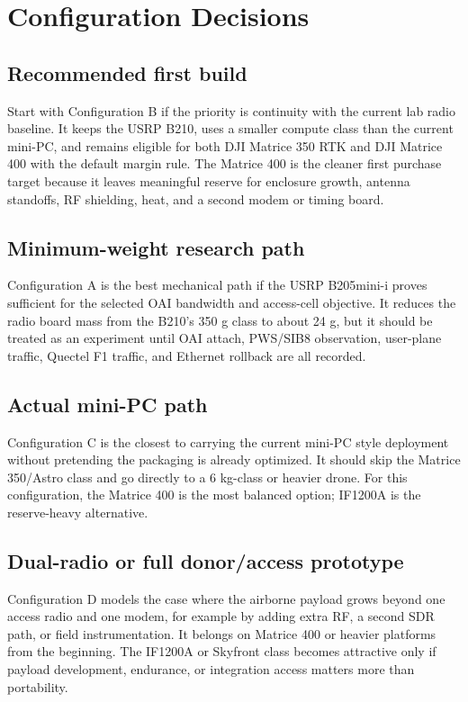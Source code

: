 \documentclass[11pt]{article}
\begin{document}
\section*{Configuration Decisions}

\subsection*{Recommended first build}

Start with Configuration B if the priority is continuity with the current lab
radio baseline. It keeps the USRP B210, uses a smaller compute class than the
current mini-PC, and remains eligible for both DJI Matrice 350 RTK and DJI
Matrice 400 with the default margin rule. The Matrice 400 is the cleaner first
purchase target because it leaves meaningful reserve for enclosure growth,
antenna standoffs, RF shielding, heat, and a second modem or timing board.

\subsection*{Minimum-weight research path}

Configuration A is the best mechanical path if the USRP B205mini-i proves
sufficient for the selected OAI bandwidth and access-cell objective. It reduces
the radio board mass from the B210's 350 g class to about 24 g, but it should be
treated as an experiment until OAI attach, PWS/SIB8 observation, user-plane
traffic, Quectel F1 traffic, and Ethernet rollback are all recorded.

\subsection*{Actual mini-PC path}

Configuration C is the closest to carrying the current mini-PC style deployment
without pretending the packaging is already optimized. It should skip the
Matrice 350/Astro class and go directly to a 6 kg-class or heavier drone. For
this configuration, the Matrice 400 is the most balanced option; IF1200A is the
reserve-heavy alternative.

\subsection*{Dual-radio or full donor/access prototype}

Configuration D models the case where the airborne payload grows beyond one
access radio and one modem, for example by adding extra RF, a second SDR path,
or field instrumentation. It belongs on Matrice 400 or heavier platforms from
the beginning. The IF1200A or Skyfront class becomes attractive only if payload
development, endurance, or integration access matters more than portability.
\end{document}
